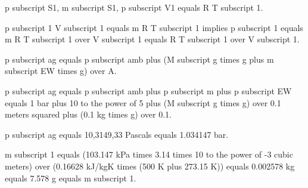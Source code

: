 p subscript S1, m subscript S1, p subscript V1 equals R T subscript 1.

p subscript 1 V subscript 1 equals m R T subscript 1 implies p subscript 1 equals m R T subscript 1 over V subscript 1 equals R T subscript 1 over V subscript 1.

p subscript ag equals p subscript amb plus (M subscript g times g plus m subscript EW times g) over A.

p subscript ag equals p subscript amb plus p subscript m plus p subscript EW equals 1 bar plus 10 to the power of 5 plus (M subscript g times g) over 0.1 meters squared plus (0.1 kg times g) over 0.1.

p subscript ag equals 10,3149,33 Pascals equals 1.034147 bar.

m subscript 1 equals (103.147 kPa times 3.14 times 10 to the power of -3 cubic meters) over (0.16628 kJ/kgK times (500 K plus 273.15 K)) equals 0.002578 kg equals 7.578 g equals m subscript 1.